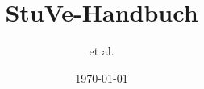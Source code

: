 \usepackage{perpage}


\title{StuVe-Handbuch}
\date{\today}
\author{et al.}

\usepackage[utf8]{inputenc}
\usepackage[T1]{fontenc}					%
\usepackage{lmodern}						%
\renewcommand{\familydefault}{\sfdefault}
\usepackage[ngerman]{babel}					%


\usepackage[left=2.2cm, right=2cm, top=1cm, bottom=1cm]{geometry}



\usepackage{layout}							%
\usepackage{totcount}						%

\usepackage[final]{pdfpages}
\usepackage{graphicx}



\addto\captionsngerman{\renewcommand{\chaptername}{Teil}}

\usepackage{titlesec}
\usepackage{fancyhdr}

\renewcommand*{\chaptermark}[1]{ \markboth{\thechapter: ##1}{} }%


\titleformat{\chapter}[display]{\normalfont\huge\bfseries}{\flushright \chaptertitlename\ \thechapter}{5pt}{\flushright \Huge}

